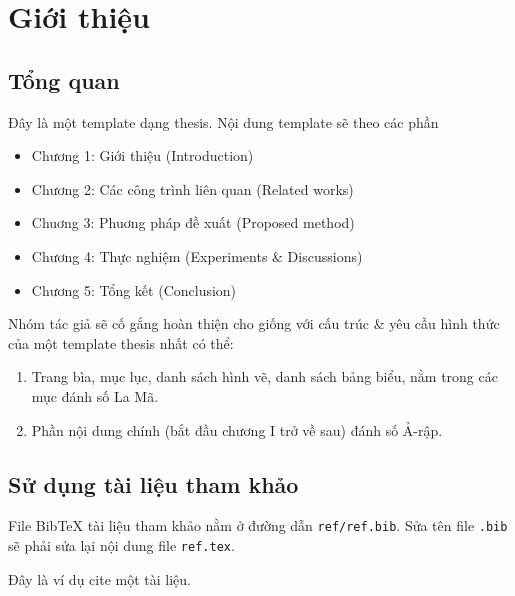 \chapter{Giới thiệu}

\section{Tổng quan}
Đây là một template dạng thesis. Nội dung template sẽ theo các phần
\begin{itemize}
\item Chương 1: Giới thiệu (Introduction)
\item Chương 2: Các công trình liên quan (Related works)
\item Chuơng 3: Phuơng pháp đề xuất (Proposed method)
\item Chương 4: Thực nghiệm (Experiments \& Discussions)
\item Chương 5: Tổng kết (Conclusion)
\end{itemize}

Nhóm tác giả sẽ cố gắng hoàn thiện cho giống với cấu trúc \& yêu cầu hình thức của một template thesis nhất có thể:

\begin{enumerate}
\item Trang bìa, mục lục, danh sách hình vẽ, danh sách bảng biểu, nằm trong các mục đánh số La Mã.
\item Phần nội dung chính (bắt đầu chương I trở về sau) đánh số Ả-rập.
\end{enumerate}

\section{Sử dụng tài liệu tham khảo}

File BibTeX tài liệu tham khảo nằm ở đường dẫn \texttt{ref/ref.bib}. Sửa tên file \texttt{.bib} sẽ phải sửa lại nội dung file \texttt{ref.tex}.

Đây là ví dụ cite một tài liệu\cite{greenwade93, goossens93}.
